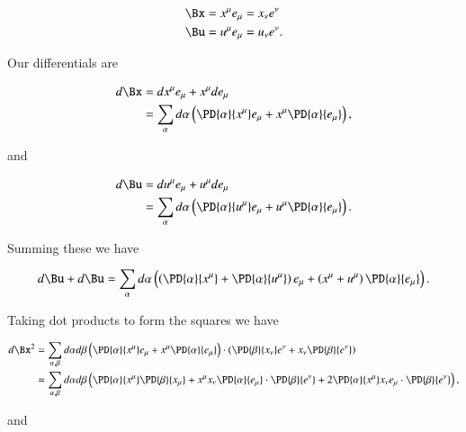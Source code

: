 \begin{align}\label{eqn:continuumL2:530}
\Bx &= x^\mu e_\mu = x_\nu e^\nu \\
\Bu &= u^\mu e_\mu = u_\nu e^\nu.
\end{align}

Our differentials are

\begin{equation}\label{eqn:continuumL2:550}
\begin{aligned}
d\Bx 
&= dx^\mu e_\mu + x^\mu d e_\mu \\
&= \sum_\alpha d\alpha \left( 
\PD{\alpha}{x^\mu} e_\mu
+
x^\mu
\PD{\alpha}{e_\mu} 
\right),
\end{aligned}
\end{equation}

and

\begin{equation}\label{eqn:continuumL2:570}
\begin{aligned}
d\Bu 
&= du^\mu e_\mu + u^\mu d e_\mu \\
&= 
\sum_\alpha
d\alpha \left( 
\PD{\alpha}{u^\mu} e_\mu
+
u^\mu
\PD{\alpha}{e_\mu} 
\right).
\end{aligned}
\end{equation}

Summing these we have

\begin{equation}\label{eqn:continuumL2:590}
d\Bu + d\Bu 
= 
\sum_\alpha
d\alpha \left( 
\left(
\PD{\alpha}{x^\mu} 
+
\PD{\alpha}{u^\mu} 
\right)
e_\mu
+
\left(
x^\mu
+
u^\mu
\right)
\PD{\alpha}{e_\mu} 
\right).
\end{equation}

Taking dot products to form the squares we have

\begin{align*}
d\Bx^2 
&= 
\sum_{\alpha, \beta} 
d\alpha 
d\beta 
\left( 
\PD{\alpha}{x^\mu} e_\mu
+
x^\mu
\PD{\alpha}{e_\mu} 
\right)
\cdot
\left( 
\PD{\beta}{x_\nu} e^\nu
+
x_\nu
\PD{\beta}{e^\nu} 
\right) 
\\
&=
\sum_{\alpha, \beta} 
d\alpha 
d\beta 
\left( 
\PD{\alpha}{x^\mu} \PD{\beta}{x_\mu} 
+
x^\mu x_\nu
\PD{\alpha}{e_\mu} 
\cdot
\PD{\beta}{e^\nu} 
+ 
2 \PD{\alpha}{x^\mu} 
x_\nu
e_\mu \cdot
\PD{\beta}{e^\nu} 
\right),
\end{align*}

and

